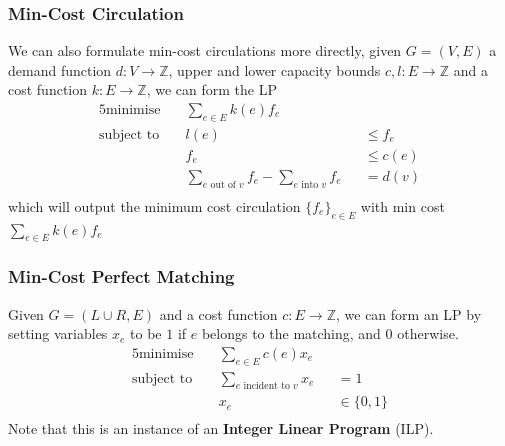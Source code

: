 \documentclass{article}
\theoremstyle{plain}
\theoremstyle{definition}
\begin{document}
        \subsubsection{Min-Cost Circulation}
            We can also formulate min-cost circulations more directly, given $G = (V,E)$ a demand function $d: V \to \mathbb{Z}$, upper and lower capacity bounds $c, l : E \to \mathbb{Z}$ and a cost function $k: E \to \mathbb{Z}$, we can form the LP
            \begin{alignat*}{5}
            \text{minimise} &\quad \sum_{e \in E}k(e)f_e && \\
            \text{subject to} 
            &\quad l(e) &&\leq f_e  \tag{for each $e \in E$} \\
            &\quad f_e &&\leq c(e)  \tag{for each $e \in E$} \\
            &\quad \sum_{e \text{ out of } v}f_e - \sum_{e \text{ into } v} f_e &&= d(v) \tag{for each $v \in V$} \\
            \end{alignat*}
            which will output the minimum cost circulation $\{ f_e \}_{e \in E}$ with min cost $\sum_{e \in E}k(e)f_e$
        \subsubsection{Min-Cost Perfect Matching}
            Given $G = (L \cup R, E)$ and a cost function $c : E \to \mathbb{Z}$, we can form an LP by setting variables $x_e$ to be $1$ if $e$ belongs to the matching, and $0$ otherwise. 
            \begin{alignat*}{5}
            \text{minimise} &\quad \sum_{e \in E}c(e)x_e && \\
            \text{subject to} 
            &\quad \sum_{e \text{ incident to } v} x_e &&= 1  \tag{for each $v \in L \cup R$} \\
            &\quad  x_e &&\in \{0, 1\}  \tag{for each $e \in E$} \\
            \end{alignat*}
            Note that this is an instance of an \textbf{Integer Linear Program} (ILP).
\end{document}
